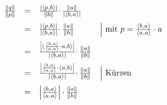 \begin{gather*}
	\begin{array}{ c r l l }
		\frac{\| q\| }{\| p\| } & = & \frac{| \langle p,b\rangle | }{\| b\| } \cdotp \frac{\| a\| }{| \langle b,a\rangle | } & \vspace{2mm}\\
		& = & \frac{| \langle p,b\rangle | }{| \langle b,a\rangle | } \cdotp \frac{\| a\| }{\| b\| } & \Bigl| \text{ mit} \ p=\frac{\langle b,a\rangle }{\langle a,a\rangle } \cdot a\vspace{2mm}\\
		& = & \frac{\left| \langle \frac{\langle b,a\rangle }{\langle a,a\rangle } \cdot a,b\rangle \right| }{| \langle b,a\rangle | } \cdotp \frac{\| a\| }{\| b\| } & \vspace{2mm}\\
		& = & \frac{\left| \frac{\langle b,a\rangle }{\langle a,a\rangle } \cdot \langle a,b\rangle \right| }{| \langle b,a\rangle | } \cdotp \frac{\| a\| }{\| b\| } & \Bigl| \text{ Kürzen}\vspace{2mm}\\
		& = & \left| \frac{\langle b,a\rangle }{\langle a,a\rangle }\right| \cdotp \frac{\| a\| }{\| b\| } &
	\end{array}\\
\end{gather*}




